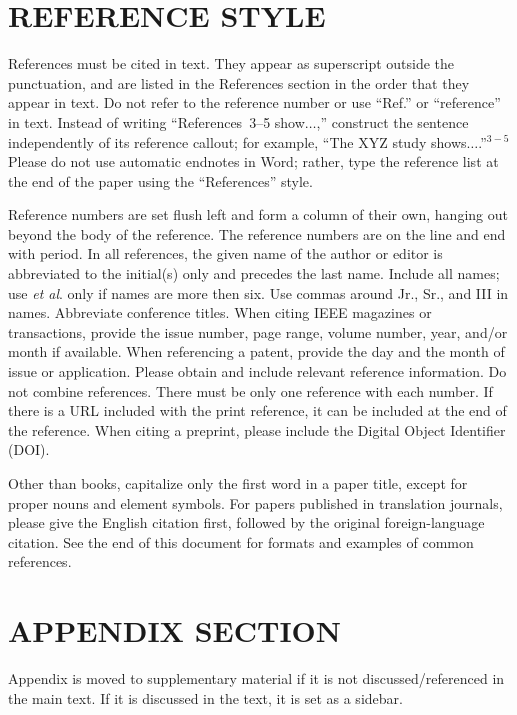 \documentclass{IEEEcsmag}
\begin{document}
\section{REFERENCE STYLE}
References must be cited in text. They appear as superscript outside the punctuation, and are listed in the References section in the order that they appear in text. Do not refer to the reference number or use ``Ref.'' or ``reference'' in text. Instead of writing ``References~3--5 show$\ldots$,'' construct the sentence independently of its reference callout; for example, ``The XYZ study shows$\ldots$.''$^{3-5}$ Please do not use automatic endnotes in Word; rather, type the reference list at the end of the paper using the ``References'' style.

Reference numbers are set flush left and form a column of their own, hanging out beyond the body of the reference. The reference numbers are on the line and end with period. In all references, the given name of the author or editor is abbreviated to the initial(s) only and precedes the last name. Include all names; use \emph{et al}. only if names are more then six. Use commas around Jr., Sr., and III in names. Abbreviate conference titles. When citing IEEE magazines or transactions, provide the issue number, page range, volume number, year, and/or month if available. When referencing a patent, provide the day and the month of issue or application. Please obtain and include relevant reference information. Do not combine references. There must be only one reference with each number. If there is a URL included with the print reference, it can be included at the end of the reference. When citing a preprint, please include the Digital Object Identifier (DOI).

Other than books, capitalize only the first word in a paper title, except for proper nouns and element symbols. For papers published in translation journals, please give the English citation first, followed by the original foreign-language citation. See the end of this document for formats and examples of common references.\vspace*{4pt}

\section{APPENDIX SECTION}

 Appendix is moved to supplementary material if it is not discussed/referenced in the main text. If it is discussed in the text, it is set as a sidebar.  
\end{document}
